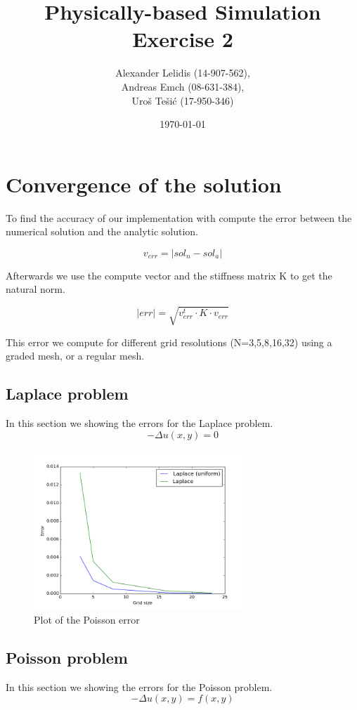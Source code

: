 \documentclass{article}
\title{Physically-based Simulation \\ Exercise 2}
\author{ 
    Alexander Lelidis (14-907-562), \\
    Andreas Emch (08-631-384), \\
    Uro\v{s} Te\v{s}i\'{c} (17-950-346)
}
\date{\today}
\begin{document}
\maketitle

\section{Convergence of the solution}
To find the accuracy of our implementation with compute the error between the numerical solution and the analytic solution.

\begin{equation}
v_{err} =|sol_n - sol_a|
\end{equation}

Afterwards we use the compute vector and the stiffness matrix K to get the natural norm.

\begin{equation}
|err| =\sqrt{v_{err}^t \cdot K \cdot v_{err}}
\end{equation}

This error we compute for different grid resolutions (N=3,5,8,16,32) using a graded mesh, or a regular mesh.

\newpage


\subsection{Laplace problem}
In this section we showing the errors for the Laplace problem.
\begin{equation}
- \Delta u(x,y) = 0
\end{equation}

\begin{figure}[!h]
\caption{Plot of the Poisson error}
\includegraphics[width=8cm]{laplace}
\centering
\end{figure}

\newpage


\subsection{Poisson problem}
In this section we showing the errors for the Poisson problem.
\begin{equation}
- \Delta u(x,y) = f(x,y)
\end{equation}
\end{document}
